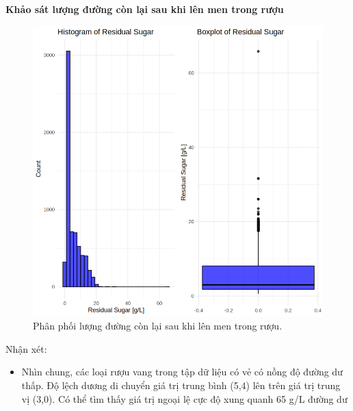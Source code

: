 \textbf{Khảo sát lượng đường còn lại sau khi lên men trong rượu}
\begin{figure}[H]
    \centering
    \includegraphics[width=0.75\columnwidth]{wine_colors/wine_sugar.png}
    \caption{Phân phối lượng đường còn lại sau khi lên men trong rượu.}
    \label{fig:wine_sugar}
\end{figure}
Nhận xét:
\begin{itemize}
    \item  Nhìn chung, các loại rượu vang trong tập dữ liệu có vẻ có nồng độ đường dư thấp. Độ lệch dương di chuyển giá trị trung bình (5,4) lên trên giá trị trung vị (3,0). Có thể tìm thấy giá trị ngoại lệ cực độ xung quanh 65 g/L đường dư
\end{itemize}

